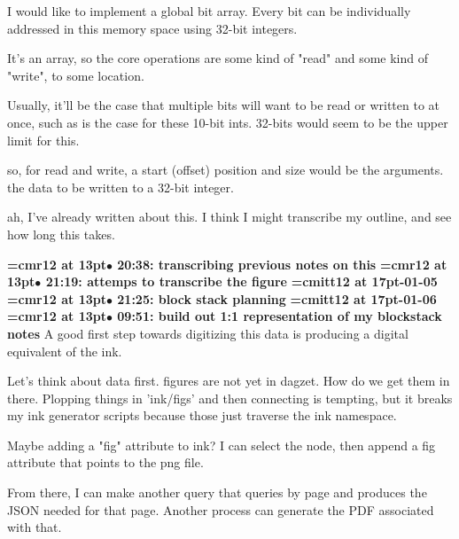 I would like to implement a global bit array. Every bit can be individually addressed in this memory space using 32-bit integers.
\par

It's an array, so the core operations are some kind of "read" and some kind of "write", to some location.
\par

Usually, it'll be the case that multiple bits will want to be read or written to at once, such as is the case for these 10-bit ints. 32-bits would seem to be the upper limit for this.
\par

so, for read and write, a start (offset) position and size would be the arguments. the data to be written to a 32-bit integer.
\par

ah, I've already written about this. I think I might transcribe my outline, and see how long this takes.
\par

{\smallskip\noindent\bf\font\titlefont=cmr12 at 13pt\titlefont $\bullet$ 20:38: transcribing previous notes on this}\smallskip
{\smallskip\noindent\bf\font\titlefont=cmr12 at 13pt\titlefont $\bullet$ 21:19: attemps to transcribe the figure}\smallskip
{\medskip\noindent\bf\font\titlefont=cmitt12 at 17pt-01-05}\medskip
{\smallskip\noindent\bf\font\titlefont=cmr12 at 13pt\titlefont $\bullet$ 21:25: block stack planning}\smallskip
{\medskip\noindent\bf\font\titlefont=cmitt12 at 17pt-01-06}\medskip
{\smallskip\noindent\bf\font\titlefont=cmr12 at 13pt\titlefont $\bullet$ 09:51: build out 1:1 representation of my blockstack notes}\smallskip
A good first step towards digitizing this data is producing a digital equivalent of the ink.
\par

Let's think about data first. figures are not yet in dagzet. How do we get them in there. Plopping things in 'ink/figs' and then connecting is tempting, but it breaks my ink generator scripts because those just traverse the ink namespace.
\par

Maybe adding a "fig" attribute to ink? I can select the node, then append a fig attribute that points to the png file.
\par

From there, I can make another query that queries by page and produces the JSON needed for that page. Another process can generate the PDF associated with that.
\par

